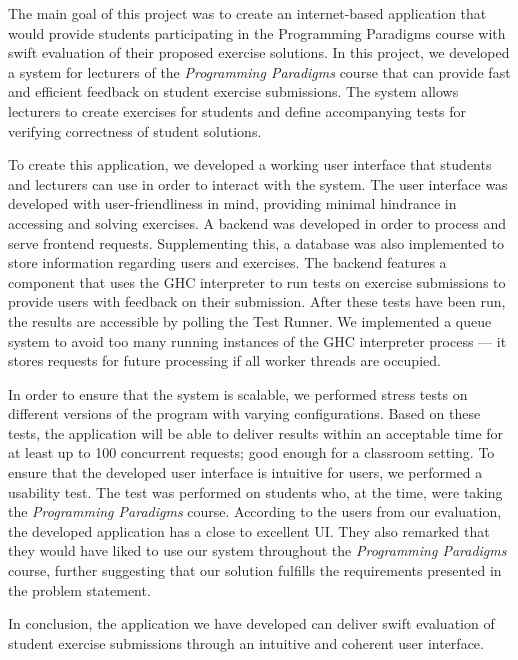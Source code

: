 The main goal of this project was to create an internet-based application that would provide students participating in the Programming Paradigms course with swift evaluation of their proposed exercise solutions.
In this project, we developed a system for lecturers of the \textit{Programming Paradigms} course that can provide fast and efficient feedback on student exercise submissions.
The system allows lecturers to create exercises for students and define accompanying tests for verifying correctness of student solutions.

To create this application, we developed a working user interface that students and lecturers can use in order to interact with the system.
The user interface was developed with user-friendliness in mind, providing minimal hindrance in accessing and solving exercises.
A backend was developed in order to process and serve frontend requests.
Supplementing this, a database was also implemented to store information regarding users and exercises.
The backend features a component that uses the GHC interpreter to run tests on exercise submissions to provide users with feedback on their submission.
After these tests have been run, the results are accessible by polling the Test Runner.
We implemented a queue system to avoid too many running instances of the GHC interpreter process --- it stores requests for future processing if all worker threads are occupied.

In order to ensure that the system is scalable, we performed stress tests on different versions of the program with varying configurations.
Based on these tests, the application will be able to deliver results within an acceptable time for at least up to 100 concurrent requests; good enough for a classroom setting.
To ensure that the developed user interface is intuitive for users, we performed a usability test.
The test was performed on students who, at the time, were taking the \textit{Programming Paradigms} course.
According to the users from our evaluation, the developed application has a close to excellent UI.
They also remarked that they would have liked to use our system throughout the \textit{Programming Paradigms} course, further suggesting that our solution fulfills the requirements presented in the problem statement.

In conclusion, the application we have developed can deliver swift evaluation of student exercise submissions through an intuitive and coherent user interface.